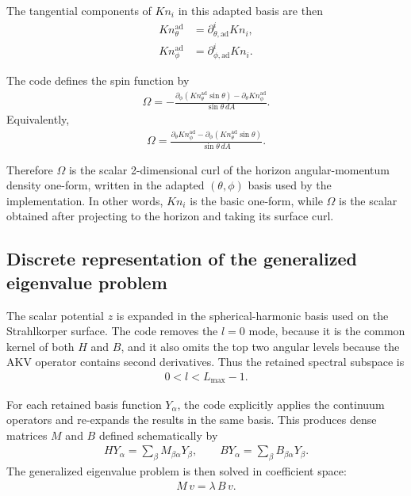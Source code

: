 The tangential components of $Kn_i$ in this adapted basis are then
\begin{align}
Kn^{\mathrm{ad}}_\theta &= \partial_{\theta,\mathrm{ad}}^i Kn_i, \\
Kn^{\mathrm{ad}}_\phi   &= \partial_{\phi,\mathrm{ad}}^i Kn_i.
\end{align}

The code defines the spin function by
\begin{align}
\Omega
  = - \frac{\partial_\phi\!\left(Kn^{\mathrm{ad}}_\theta \sin\theta\right)
           - \partial_\theta Kn^{\mathrm{ad}}_\phi}
          {\sin\theta\, dA}.
\label{eq:spec-omega-code}
\end{align}
Equivalently,
\begin{align}
\Omega
  = \frac{\partial_\theta Kn^{\mathrm{ad}}_\phi
         - \partial_\phi\!\left(Kn^{\mathrm{ad}}_\theta \sin\theta\right)}
         {\sin\theta\, dA}.
\end{align}

Therefore $\Omega$ is the scalar 2-dimensional curl of the horizon angular-momentum density one-form, written in the adapted $(\theta,\phi)$ basis used by the implementation.  In other words, $Kn_i$ is the basic one-form, while $\Omega$ is the scalar obtained after projecting to the horizon and taking its surface curl.

\subsection{Discrete representation of the generalized eigenvalue problem}

The scalar potential $z$ is expanded in the spherical-harmonic basis used on the Strahlkorper surface.  The code removes the $l=0$ mode, because it is the common kernel of both $H$ and $B$, and it also omits the top two angular levels because the AKV operator contains second derivatives.  Thus the retained spectral subspace is
\begin{align}
0 < l < L_{\max}-1.
\end{align}

For each retained basis function $Y_\alpha$, the code explicitly applies the continuum operators and re-expands the results in the same basis.  This produces dense matrices $M$ and $B$ defined schematically by
\begin{align}
H Y_\alpha = \sum_\beta M_{\beta\alpha} Y_\beta,
\qquad
B Y_\alpha = \sum_\beta B_{\beta\alpha} Y_\beta.
\end{align}
The generalized eigenvalue problem is then solved in coefficient space:
\begin{align}
M\, v = \lambda\, B\, v.
\label{eq:spec-discrete-gep}
\end{align}

